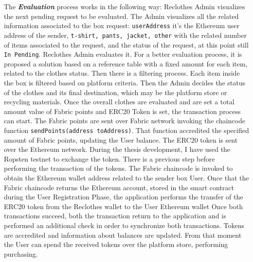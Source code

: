 \begin{outline}[enumerate]
    \1 The \textit{\bf{Evaluation}} process works in the following way:
    \2 Reclothes Admin visualizes the next pending request to be evaluated. The Admin visualizes all the related information
    associated to the box request: \texttt{userAddress} it's the Ethereum user address of the sender, 
    \texttt{t-shirt, pants, jacket, other} with the related number of items associated to the request,
    and the status of the request, at this point still \texttt{In Pending}.
    \2 Reclothes Admin evaluates it. For a better evaluation process, it is proposed a solution based on a reference table 
    with a fixed amount for each item, related to the clothes status. Then there is a filtering process. Each item 
    inside the box is filtered based on platform criteria. Then the Admin decides the status of the clothes and its 
    final destination, which may be the platform store or recycling materials. Once the overall clothes are 
    evaluated and are set a total amount value of Fabric points and ERC20 Token is set, the transaction process can start.
    \3 The Fabric points are sent over Fabric network invoking the chaincode function \texttt{sendPoints(address toAddress)}.
    That function accredited the specified amount of Fabric points, updating the User balance. 
    \3 The ERC20 token is sent over the Ethereum network. During the thesis development, I have used the Ropsten testnet 
    to exchange the token. There is a previous step before performing the transaction of the tokens. The Fabric 
    chaincode is invoked to obtain the Ethereum wallet address related to the sender box User. Once that the Fabric 
    chaincode returns the Ethereum account, stored in the smart contract during the User Registration Phase, the 
    application performs the transfer of the ERC20 token from the Reclothes wallet to the User Ethereum wallet
    \2 Once both transactions succeed, both the transaction return to the application and is performed
    an additional check in order to synchronize both transactions. Tokens are accredited and 
    information about balances are updated. From that moment the User can spend the received
    tokens over the platform store, performing purchasing. 


\end{outline}
